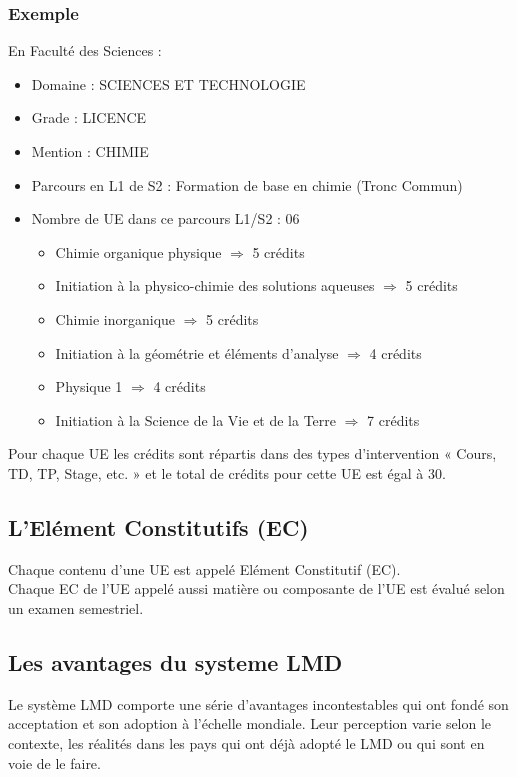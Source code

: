 \subsubsection{Exemple} En Faculté des Sciences : 
\begin{itemize}
	\item Domaine : SCIENCES ET TECHNOLOGIE
	\item Grade : LICENCE
	\item Mention : CHIMIE
	\item Parcours en L1 de S2 : Formation de base en chimie (Tronc Commun)
	\item Nombre de UE dans ce parcours L1/S2 : 06
	\begin{itemize}
		\item [\textbullet] Chimie organique physique $ \Longrightarrow $ 5 crédits
		\item [\textbullet] Initiation à la physico-chimie des solutions aqueuses $ \Longrightarrow $ 5 crédits
		\item [\textbullet] Chimie inorganique $ \Longrightarrow $ 5 crédits
		\item [\textbullet] Initiation à la géométrie et éléments d'analyse $ \Longrightarrow $ 4 crédits
		\item [\textbullet] Physique 1 $ \Longrightarrow $ 4 crédits
		\item [\textbullet] Initiation à la Science de la Vie et de la Terre $ \Longrightarrow $ 7 crédits
	\end{itemize}
\end{itemize}
Pour chaque UE les crédits sont répartis dans des types d'intervention « Cours, TD, TP, Stage, etc. » et le total de crédits pour cette UE est égal à 30.

\subsection{L'Elément Constitutifs (EC)}
Chaque contenu d'une UE est appelé Elément Constitutif (EC).\\
Chaque EC de l'UE appelé aussi matière ou composante de l'UE est évalué selon un examen semestriel.

\subsection{Les avantages du systeme LMD}
Le système LMD comporte une série d'avantages incontestables qui ont fondé son acceptation et son adoption à l'échelle mondiale. Leur perception varie selon le contexte, les réalités dans les pays qui ont déjà adopté le LMD ou qui sont en voie de le faire. 

